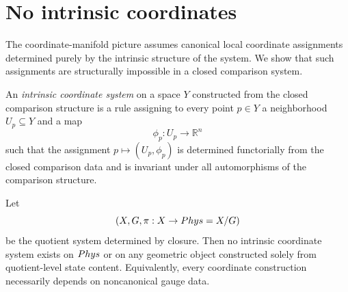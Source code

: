 \section{No intrinsic coordinates}
\label{sec:no-intrinsic-coordinates}
The coordinate-manifold picture assumes canonical local coordinate
assignments determined purely by the intrinsic structure of the system.
We show that such assignments are structurally impossible in a closed
comparison system.
\begin{definition}
	An \emph{intrinsic coordinate system} on a space \(Y\) constructed from
	the closed comparison structure is a rule assigning to every point
	\(p\in Y\) a neighborhood \(U_p\subseteq Y\) and a map
	\[
		\phi_p:U_p\to\mathbb R^n
	\]
	such that the assignment \(p\mapsto(U_p,\phi_p)\) is determined
	functorially from the closed comparison data and is invariant under all
	automorphisms of the comparison structure.
\end{definition}
\begin{theorem}
	\label{thm:no-intrinsic-coordinates}
	Let
	\[
		(X,G,\pi:X\to Phys=X/G)
	\]
	be the quotient system determined by closure.
	Then no intrinsic coordinate system exists on \(Phys\) or on any
	geometric object constructed solely from quotient-level state content.
	Equivalently, every coordinate construction necessarily depends on
	noncanonical gauge data.
\end{theorem}
